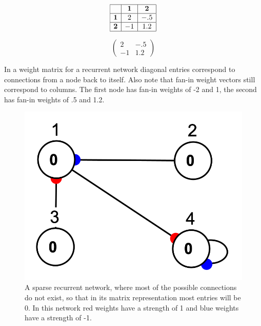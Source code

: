 \begin{minipage}{0.5\textwidth}
\centering
\[
\begin{array}{|c|c|c|}
\hline
\multicolumn{1}{|c|}{} & \textbf{1} & \textbf{2} \\
\hline
\textbf{1} & 2 & -.5 \\
\hline
\textbf{2} & -1 & 1.2 \\
\hline
\end{array}
\]
\end{minipage}
\begin{minipage}{0.5\textwidth}
\centering
\[
\begin{pmatrix}
 2  &  -.5 \\
 -1  & 1.2 
\end{pmatrix}
\]
\end{minipage}
\vspace*{.1cm} 

\noindent In a weight matrix for a recurrent network diagonal entries correspond to connections from a node back to itself. Also note that fan-in weight vectors still correspond to columns. The first node has fan-in weights of -2 and 1, the second has fan-in weights of .5 and 1.2.

\begin{figure}[h]
\centering
\includegraphics[scale=0.5]{./images/sparseRecurrent.png}
\caption[Jeff Yoshimi.]{A sparse recurrent network, where most of the possible connections do not exist, so that in its matrix representation most entries will be 0. In this network red weights have a strength of 1 and blue weights have a strength of -1.} 
\label{sparseRecurrent}
\end{figure}

